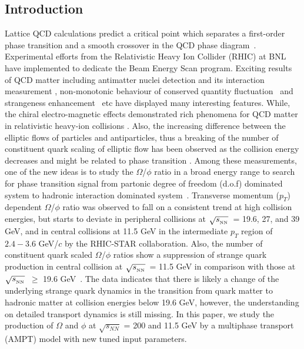 \documentclass[twocolumn,aps,prc,showpacs,superscriptaddress,preprintnumbers,floatfix,nofootinbib]{revtex4}
\newcommand{ \srt  }{$\sqrt{s_{_{\rm NN}}}$}
\begin{document}
\begin{CJK*}{GBK}{song}
\section{Introduction}

Lattice QCD calculations predict a critical point which separates a first-order phase transition and a smooth crossover in the QCD phase diagram~\cite{phase1,phase2}. Experimental efforts from the Relativistic Heavy Ion Collider (RHIC) at BNL have implemented to dedicate  the Beam Energy Scan  program. Exciting results of QCD matter including antimatter nuclei detection and its interaction measurement \cite{Science,Nature,Nature2,Ma_review,Zhang_NST},
non-monotonic behaviour of conserved quantity fluctuation~\cite{STARnetp,STARnetq,STARpidC,Ko2016,Luo} and strangeness enhancement~\cite{NA491,NA492} etc have displayed many interesting features. While,  the chiral electro-magnetic effects demonstrated  rich phenomena for QCD matter in relativistic heavy-ion collisions  \cite{Dima,HuangXG,MaGL}.
Also,  the increasing difference between the elliptic flows of particles and antiparticles, thus a breaking of the
number of constituent quark scaling of elliptic flow has been observed as the collision energy decreases \cite{STAR_v2} and might be related to phase transition \cite{Tian,Xu_PRL,Ko2013}.
Among these measurements, one of the new ideas is to study the $\Omega$/$\phi$ ratio in a broad energy range to search for phase transition signal from partonic degree of freedom (d.o.f) dominated system to hadronic interaction dominated system~\cite{Omegaphical}.  Transverse momentum ($p_T$) dependent  $\Omega$/$\phi$ ratio was observed to  fall on a consistent trend at high collision energies, but starts to deviate in peripheral collisions at \srt ~= 19.6, 27, and 39 GeV, and in central collisions at 11.5 GeV in the intermediate $p_T$ region of $2.4-3.6$ GeV/$c$ \cite{OmegaphiSTAR}  by the RHIC-STAR collaboration\cite{STAR_detector,XuYF,MaLong}. Also, the number of constituent quark scaled $\Omega$/$\phi$ ratios show a suppression of strange quark production in central collision at \srt ~= 11.5 GeV in comparison with those at \srt ~$\geq$ 19.6 GeV~\cite{OmegaphiSTAR}. The data indicates that there is likely a change of the underlying strange quark dynamics in the transition from quark matter to hadronic matter at collision energies below 19.6 GeV, however, the understanding on detailed transport dynamics is still missing. In this paper, we study the  production of $\Omega$ and $\phi$ at $\sqrt{s_{NN}}$ = 200 and 11.5 GeV by a multiphase transport (AMPT) model with new tuned input parameters.


\end{CJK*}
\end{document}
